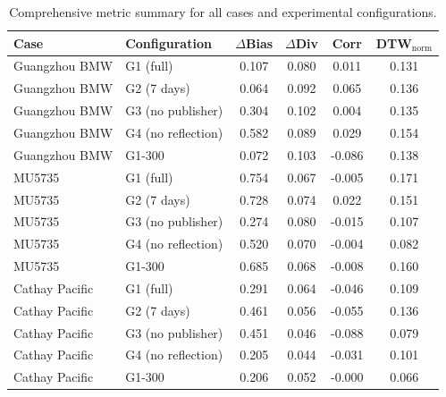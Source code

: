 \begin{table}[t]
\centering
\caption{Comprehensive metric summary for all cases and experimental configurations.}
\label{tab:all_configs}
\begin{tabular}{llcccc}
\toprule
Case & Configuration & $\Delta$Bias & $\Delta$Div & Corr & DTW$_{\mathrm{norm}}$ \\
\midrule
Guangzhou BMW & G1 (full) & 0.107 & 0.080 & 0.011 & 0.131 \\
Guangzhou BMW & G2 (7 days) & 0.064 & 0.092 & 0.065 & 0.136 \\
Guangzhou BMW & G3 (no publisher) & 0.304 & 0.102 & 0.004 & 0.135 \\
Guangzhou BMW & G4 (no reflection) & 0.582 & 0.089 & 0.029 & 0.154 \\
Guangzhou BMW & G1-300 & 0.072 & 0.103 & -0.086 & 0.138 \\
MU5735 & G1 (full) & 0.754 & 0.067 & -0.005 & 0.171 \\
MU5735 & G2 (7 days) & 0.728 & 0.074 & 0.022 & 0.151 \\
MU5735 & G3 (no publisher) & 0.274 & 0.080 & -0.015 & 0.107 \\
MU5735 & G4 (no reflection) & 0.520 & 0.070 & -0.004 & 0.082 \\
MU5735 & G1-300 & 0.685 & 0.068 & -0.008 & 0.160 \\
Cathay Pacific & G1 (full) & 0.291 & 0.064 & -0.046 & 0.109 \\
Cathay Pacific & G2 (7 days) & 0.461 & 0.056 & -0.055 & 0.136 \\
Cathay Pacific & G3 (no publisher) & 0.451 & 0.046 & -0.088 & 0.079 \\
Cathay Pacific & G4 (no reflection) & 0.205 & 0.044 & -0.031 & 0.101 \\
Cathay Pacific & G1-300 & 0.206 & 0.052 & -0.000 & 0.066 \\
\bottomrule
\end{tabular}
\end{table}
